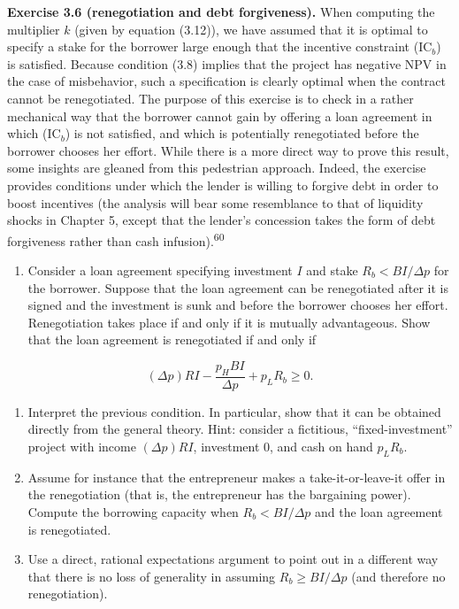 \documentclass[11pt,a4paper]{article}
\providecommand{\tightlist}{\setlength{\itemsep}{0pt}\setlength{\parskip}{0pt}}
\begin{document}
\textbf{Exercise 3.6 (renegotiation and debt forgiveness).} When computing the multiplier \(k\)
(given by equation (3.12)), we have assumed that it is optimal to specify a stake for the borrower
large enough that the incentive constraint (IC\(_b\)) is satisfied. Because condition (3.8) implies
that the project has negative NPV in the case of misbehavior, such a specification is clearly
optimal when the contract cannot be renegotiated. The purpose of this exercise is to check in a
rather mechanical way that the borrower cannot gain by offering a loan agreement in which (IC\(_b\))
is not satisfied, and which is potentially renegotiated before the borrower chooses her effort.
While there is a more direct way to prove this result, some insights are gleaned from this
pedestrian approach. Indeed, the exercise provides conditions under which the lender is willing to
forgive debt in order to boost incentives (the analysis will bear some resemblance to that of
liquidity shocks in Chapter 5, except that the lender's concession takes the form of debt
forgiveness rather than cash infusion).\textsuperscript{60}

\begin{enumerate}
\def\labelenumi{(\roman{enumi})}
\tightlist
\item
  Consider a loan agreement specifying investment \(I\) and stake \(R_b < BI/\Delta p\) for the
  borrower. Suppose that the loan agreement can be renegotiated after it is signed and the
  investment is sunk and before the borrower chooses her effort. Renegotiation takes place if and
  only if it is mutually advantageous. Show that the loan agreement is renegotiated if and only if
\end{enumerate}

\[(\Delta p)RI - \frac{p_H BI}{\Delta p} + p_L R_b \geqslant 0.\]

\begin{enumerate}
\def\labelenumi{(\roman{enumi})}
\setcounter{enumi}{1}
\item
  Interpret the previous condition. In particular, show that it can be obtained directly from the
  general theory. Hint: consider a fictitious, ``fixed-investment'' project with income
  \((\Delta p)RI\), investment 0, and cash on hand \(p_L R_b\).
\item
  Assume for instance that the entrepreneur makes a take-it-or-leave-it offer in the renegotiation
  (that is, the entrepreneur has the bargaining power). Compute the borrowing capacity when
  \(R_b < BI/\Delta p\) and the loan agreement is renegotiated.
\item
  Use a direct, rational expectations argument to point out in a different way that there is no loss
  of generality in assuming \(R_b \geqslant BI/\Delta p\) (and therefore no renegotiation).
\end{enumerate}
\end{document}
